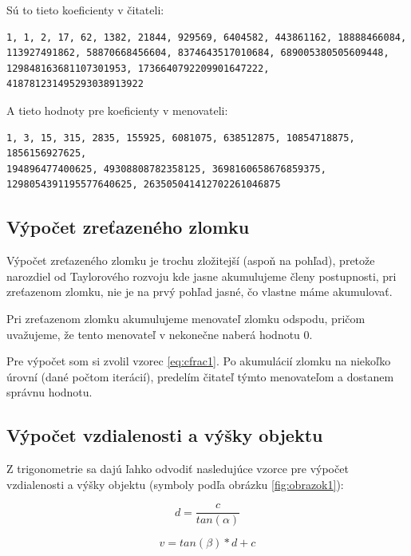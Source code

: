 \documentclass[12pt,a4paper,titlepage,final]{article}
\begin{document}
Sú to tieto koeficienty v čitateli\cite{taylorNum}:
\begin{verbatim}
1, 1, 2, 17, 62, 1382, 21844, 929569, 6404582, 443861162, 18888466084,
113927491862, 58870668456604, 8374643517010684, 689005380505609448,
129848163681107301953, 1736640792209901647222, 418781231495293038913922
\end{verbatim}

A tieto hodnoty pre koeficienty v menovateli\cite{taylorDenom}:
\begin{verbatim}
1, 3, 15, 315, 2835, 155925, 6081075, 638512875, 10854718875, 1856156927625,
194896477400625, 49308808782358125, 3698160658676859375,
1298054391195577640625, 263505041412702261046875
\end{verbatim}

\subsection{Výpočet zreťazeného zlomku} \label{cfracNavrh}

Výpočet zreťazeného zlomku je trochu zložitejší (aspoň na pohľad), pretože narozdiel od Taylorového rozvoju kde jasne akumulujeme členy postupnosti, pri zreťazenom zlomku, nie je na prvý pohľad jasné, čo vlastne máme akumulovať.

Pri zreťazenom zlomku akumulujeme menovateľ zlomku odspodu, pričom uvažujeme, že tento menovateľ v nekonečne naberá hodnotu 0.

Pre výpočet som si zvolil vzorec \ref{eq:cfrac1}. Po akumulácií zlomku na niekoľko úrovní (dané počtom iterácií), predelím čitateľ týmto menovateľom a dostanem správnu hodnotu.

\subsection{Výpočet vzdialenosti a výšky objektu}\label{measures}

Z trigonometrie sa dajú ľahko odvodiť nasledujúce vzorce pre výpočet vzdialenosti a výšky objektu (symboly podľa obrázku \ref{fig:obrazok1}):

\begin{equation}
d = \frac{c}{tan(\alpha)}
\end{equation}

\begin{equation}
v = tan(\beta)*d + c
\end{equation}
\end{document}
